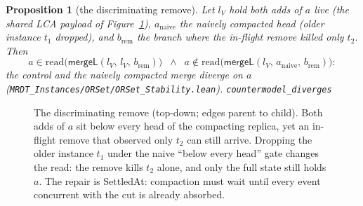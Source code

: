 \documentclass[11pt]{article}
\newtheorem{proposition}[theorem]{Proposition}
\newcommand{\add}{\mathsf{add}}
\newcommand{\rem}{\mathsf{rem}}
\newcommand{\mergeL}{\mathsf{mergeL}}
\newcommand{\lean}[1]{\texttt{#1}}
\begin{document}
\begin{proposition}[the discriminating remove]
\label{prop:discrem}
Let $l_V$ hold both adds of $a$ live (the shared LCA payload of
Figure~\ref{fig:discrem}), $a_{\mathrm{naive}}$ the naively compacted
head (older instance $t_1$ dropped), and $b_{\mathrm{rem}}$ the branch
where the in-flight remove killed only $t_2$. Then
\[
  a \in \mathrm{read}\bigl(\mergeL(l_V,\, l_V,\, b_{\mathrm{rem}})\bigr)
  \;\;\wedge\;\;
  a \notin \mathrm{read}\bigl(\mergeL(l_V,\, a_{\mathrm{naive}},\,
  b_{\mathrm{rem}})\bigr) :
\]
the control and the naively compacted merge diverge on $a$
(\lean{MRDT\_Instances/ORSet/ORSet\_Stability.lean}).
\hfill\lean{countermodel\_diverges}
\end{proposition}

\begin{figure}[t]
\centering
{}
\caption{The discriminating remove (top-down; edges parent to child).
Both adds of $a$ sit below every head of the compacting replica, yet an
in-flight remove that observed only $t_2$ can still arrive. Dropping
the older instance $t_1$ under the naive ``below every head'' gate
changes the read: the remove kills $t_2$ alone, and only the full state
still holds $a$. The repair is SettledAt: compaction must wait until
every event concurrent with the cut is already absorbed.}
\label{fig:discrem}
\end{figure}
\end{document}
